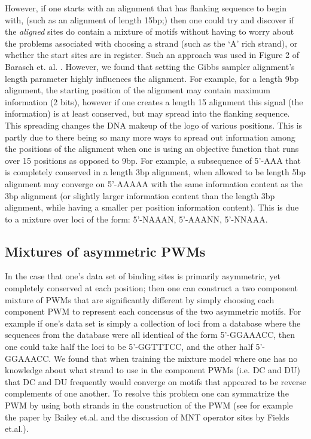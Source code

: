   However, if one starts with an alignment that has flanking sequence to begin with, (such as an alignment of length 15bp;) then one could try and discover if the \textit{aligned} sites do contain a mixture of motifs without having to worry about the problems associated with choosing a strand (such as the `A' rich strand), or whether the start sites are in register.  Such an approach was used in Figure 2 of Barasch et. al. \cite{barasch}.  However, we found that setting the Gibbs sampler alignment's length parameter highly influences the alignment.  For example, for a length 9bp alignment, the starting position of the alignment may contain maximum information (2 bits), however if one creates a length 15 alignment this signal (the information) is at least conserved, but may spread into the flanking sequence.  This spreading changes the DNA makeup of the logo of various positions.  This is partly due to there being so many more ways to spread out information among the positions of the alignment when one is using an objective function that runs over 15 positions as opposed to 9bp.  For example, a subsequence of 5'-AAA that is completely conserved in a length 3bp  alignment, when allowed to be length 5bp alignment may converge on 5'-AAAAA with the same information content as the 3bp alignment (or slightly larger information content than the length 3bp alignment, while having a smaller per position information content).  This is due to a mixture over loci of the form: 5'-NAAAN, 5'-AAANN, 5'-NNAAA.
  
  
\subsection{ Mixtures of asymmetric PWMs}
In the case that one's data set of binding sites is primarily asymmetric, yet completely conserved at each position; then one can construct a two component mixture of PWMs that are significantly different by simply choosing each component PWM to represent each concensus of the two asymmetric motifs.  For example if one's data set is simply a collection of loci from a database where the sequences from the database were all identical of the form 5'-GGAAACC, then one could take half the loci to be 5'-GGTTTCC, and the other half 5'-GGAAACC.  We found that when training the mixture model where one has no knowledge about what strand to use in the component PWMs (i.e. DC and DU) that DC and DU frequently would converge on motifs that appeared to be reverse complements of one another.  To resolve this problem one can symmatrize the PWM by using both strands in the construction of the PWM (see for example the paper by Bailey et.al.\cite{pmid7584439} and the discussion of MNT operator sites by Fields et.al.\cite{pmid9268651}).

